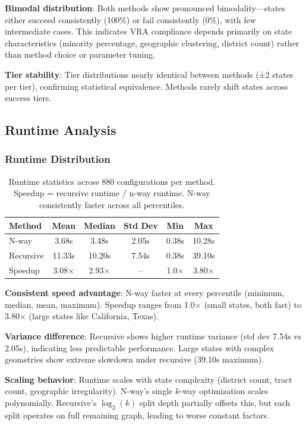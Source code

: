 \textbf{Bimodal distribution}: Both methods show pronounced bimodality—states either succeed consistently (100\%) or fail consistently (0\%), with few intermediate cases. This indicates VRA compliance depends primarily on state characteristics (minority percentage, geographic clustering, district count) rather than method choice or parameter tuning.

\textbf{Tier stability}: Tier distributions nearly identical between methods (±2 states per tier), confirming statistical equivalence. Methods rarely shift states across success tiers.

\subsection{Runtime Analysis}

\subsubsection{Runtime Distribution}

\begin{table}[h]
\centering
\begin{tabular}{lccccc}
\toprule
\textbf{Method} & \textbf{Mean} & \textbf{Median} & \textbf{Std Dev} & \textbf{Min} & \textbf{Max} \\
\midrule
N-way     & 3.68s & 3.48s & 2.05s & 0.38s & 10.28s \\
Recursive & 11.33s & 10.20s & 7.54s & 0.38s & 39.10s \\
\midrule
Speedup   & 3.08$\times$ & 2.93$\times$ & -- & 1.0$\times$ & 3.80$\times$ \\
\bottomrule
\end{tabular}
\caption{Runtime statistics across 880 configurations per method. Speedup = recursive runtime / n-way runtime. N-way consistently faster across all percentiles.}
\label{tab:runtime_distribution}
\end{table}

\textbf{Consistent speed advantage}: N-way faster at every percentile (minimum, median, mean, maximum). Speedup ranges from 1.0$\times$ (small states, both fast) to 3.80$\times$ (large states like California, Texas).

\textbf{Variance difference}: Recursive shows higher runtime variance (std dev 7.54s vs 2.05s), indicating less predictable performance. Large states with complex geometries show extreme slowdown under recursive (39.10s maximum).

\textbf{Scaling behavior}: Runtime scales with state complexity (district count, tract count, geographic irregularity). N-way's single $k$-way optimization scales polynomially. Recursive's $\log_2(k)$ split depth partially offsets this, but each split operates on full remaining graph, leading to worse constant factors.

